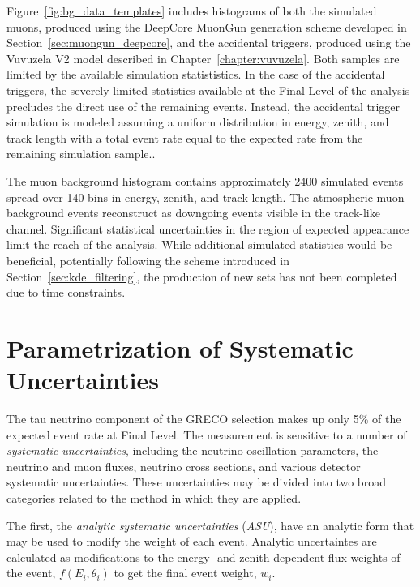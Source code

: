 Figure~\ref{fig:bg_data_templates} includes histograms of both the simulated muons, produced using the DeepCore MuonGun generation scheme developed in Section~\ref{sec:muongun_deepcore}, and the accidental triggers, produced using the Vuvuzela V2 model described in Chapter~\ref{chapter:vuvuzela}.
Both samples are limited by the available simulation statististics.
In the case of the accidental triggers, the severely limited statistics available at the Final Level of the analysis precludes the direct use of the remaining events.
Instead, the accidental trigger simulation is modeled assuming a uniform distribution in energy, zenith, and track length with a total event rate equal to the expected rate from the remaining simulation sample..

The muon background histogram contains approximately 2400 simulated events spread over 140 bins in energy, zenith, and track length.
The atmospheric muon background events reconstruct as downgoing events visible in the track-like channel.
Significant statistical uncertainties in the region of expected appearance limit the reach of the analysis.
While additional simulated statistics would be beneficial, potentially following the scheme introduced in Section~\ref{sec:kde_filtering}, the production of new sets has not been completed due to time constraints.


















\label{sec:parametrization_systematics}
\section{Parametrization of Systematic Uncertainties}
The tau neutrino component of the GRECO selection makes up only 5\% of the expected event rate at Final Level.
The measurement is sensitive to a number of \emph{systematic uncertainties}, including the neutrino oscillation parameters, the neutrino and muon fluxes, neutrino cross sections, and various detector systematic uncertainties.
These uncertainties may be divided into two broad categories related to the method in which they are applied.

The first, the \emph{analytic systematic uncertainties} (\emph{ASU}), have an analytic form that may be used to modify the weight of each event. 
Analytic uncertaintes are calculated as modifications to the energy- and zenith-dependent flux weights of the event, $f(E_i, \theta_i)$ to get the final event weight, $w_i$.

